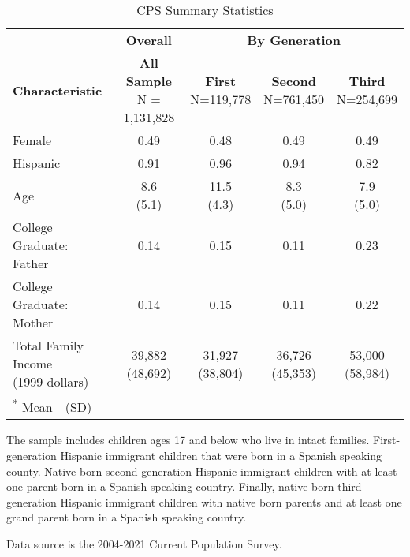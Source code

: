 \begin{table}[H]

\caption{CPS Summary Statistics\label{tab:sumstat1}}
\centering
\begin{threeparttable}
\begin{tabular}[t]{lcccc}
\toprule
\multicolumn{1}{c}{ } & \multicolumn{1}{c}{\textbf{Overall}} & \multicolumn{3}{c}{\textbf{By Generation}} \\
\cmidrule(l{3pt}r{3pt}){2-2} \cmidrule(l{3pt}r{3pt}){3-5}
\textbf{Characteristic} & \makecell[l]{\textbf{All Sample} \\N = 1,131,828} & \makecell[c]{\textbf{First} \\N=119,778} & \makecell[c]{\textbf{Second} \\N=761,450} & \makecell[c]{\textbf{Third} \\N=254,699}\\
\midrule
Female & 0.49 & 0.48 & 0.49 & 0.49\\
Hispanic & 0.91 & 0.96 & 0.94 & 0.82\\
Age & \makecell[c]{8.6 \\(5.1)} & \makecell[c]{11.5 \\(4.3)} & \makecell[c]{8.3 \\(5.0)} & \makecell[c]{7.9 \\(5.0)}\\
\makecell[l]{College Graduate: \\ \hspace{1em}Father} & 0.14 & 0.15 & 0.11 & 0.23\\
\makecell[l]{College Graduate: \\ \hspace{1em}Mother} & 0.14 & 0.15 & 0.11 & 0.22\\
\makecell[l]{Total Family Income \\\hspace{1em}(1999 dollars)} & \makecell[c]{39,882 \\(48,692)} & \makecell[c]{31,927 \\(38,804)} & \makecell[c]{36,726 \\(45,353)} & \makecell[c]{53,000 \\(58,984)}\\
\bottomrule
\multicolumn{5}{l}{\rule{0pt}{1em}\textsuperscript{*} Mean\ \ (SD)}\\
\end{tabular}
\begin{tablenotes}
\item[1] The sample includes children ages 17 and below who live in intact families. First-generation Hispanic immigrant children that were born in a Spanish speaking county. Native born second-generation Hispanic immigrant children with at least one parent born in a Spanish speaking country. Finally, native born third-generation Hispanic immigrant children with native born parents and at least one grand parent born in a Spanish speaking country.
\item[2] Data source is the 2004-2021 Current Population Survey.
\end{tablenotes}
\end{threeparttable}
\end{table}
